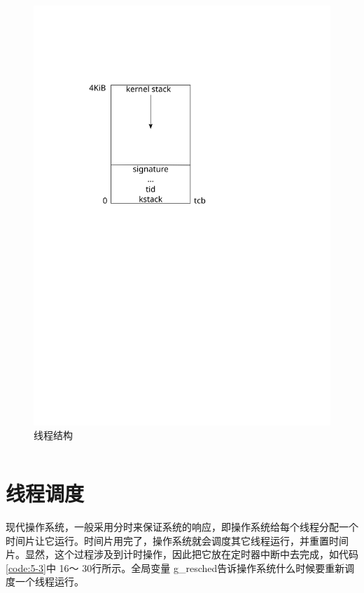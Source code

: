 \documentclass[main.tex]{subfiles}
\begin{document}
\begin{CJK*}{UTF8}{song}
\begin{figure}[htp]
\centering
\includegraphics[scale=0.4]{figures/5-1}
\caption{线程结构}
\label{figure:5-1}
\end{figure}

\begin{code}
\label{code:5-2}
\inputminted[firstline=162,lastline=202,linenos,numbersep=5pt,frame=lines,framesep=2mm]{c}{src/chapter05/kernel/task.c}
\end{code}

\section{线程调度}
现代操作系统，一般采用分时来保证系统的响应，即操作系统给每个线程分配一个时间片让它运行。时间片用完了，操作系统就会调度其它线程运行，并重置时间片。显然，这个过程涉及到计时操作，因此把它放在定时器中断中去完成，如代码\ref{code:5-3}中 16～ 30行所示。全局变量 g\_\-resched告诉操作系统什么时候要重新调度一个线程运行。


\end{CJK*}
\end{document}
